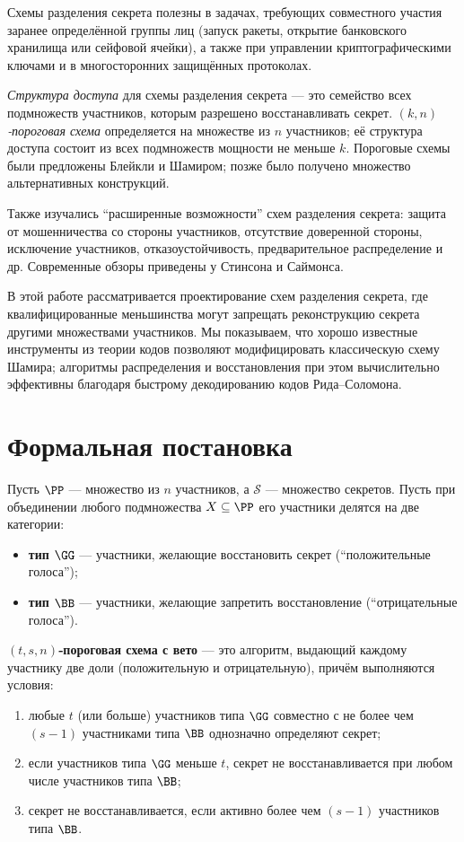 \documentclass[a4paper,12pt]{article}
\begin{document}
Схемы разделения секрета полезны в задачах, требующих совместного участия заранее определённой группы лиц (запуск ракеты, открытие банковского хранилища или сейфовой ячейки), а также при управлении криптографическими ключами и в многосторонних защищённых протоколах.

\textit{Структура доступа} для схемы разделения секрета --- это семейство всех подмножеств участников, которым разрешено восстанавливать секрет. \emph{$(k,n)$‑пороговая схема} определяется на множестве из $n$ участников; её структура доступа состоит из всех подмножеств мощности не меньше $k$. Пороговые схемы были предложены Блейкли и Шамиром; позже было получено множество альтернативных конструкций.

Также изучались \enquote{расширенные возможности} схем разделения секрета: защита от мошенничества со стороны участников, отсутствие доверенной стороны, исключение участников, отказоустойчивость, предварительное распределение и др. Современные обзоры приведены у Стинсона и Саймонса.

В этой работе рассматривается проектирование схем разделения секрета, где квалифицированные меньшинства могут запрещать реконструкцию секрета другими множествами участников. Мы показываем, что хорошо известные инструменты из теории кодов позволяют модифицировать классическую схему Шамира; алгоритмы распределения и восстановления при этом вычислительно эффективны благодаря быстрому декодированию кодов Рида–Соломона.

\section{Формальная постановка}

Пусть $\PP$ --- множество из $n$ участников, а $\mathcal{S}$ --- множество секретов. Пусть при объединении любого подмножества $X \subseteq \PP$ его участники делятся на две категории:
\begin{itemize}[nosep]
  \item \textbf{тип $\GG$} --- участники, желающие восстановить секрет (\enquote{положительные голоса});
  \item \textbf{тип $\BB$} --- участники, желающие запретить восстановление (\enquote{отрицательные голоса}).
\end{itemize}

\noindent\textbf{$(t,s,n)$‑пороговая схема с вето} --- это алгоритм, выдающий каждому участнику две доли (положительную и отрицательную), причём выполняются условия:
\begin{enumerate}[label=\textbullet, leftmargin=1.5em, itemsep=2pt]
  \item любые $t$ (или больше) участников типа $\GG$ совместно с не более чем $(s-1)$ участниками типа $\BB$ однозначно определяют секрет;
  \item если участников типа $\GG$ меньше $t$, секрет не восстанавливается при любом числе участников типа $\BB$;
  \item секрет не восстанавливается, если активно более чем $(s-1)$ участников типа $\BB$.
\end{enumerate}
\end{document}

